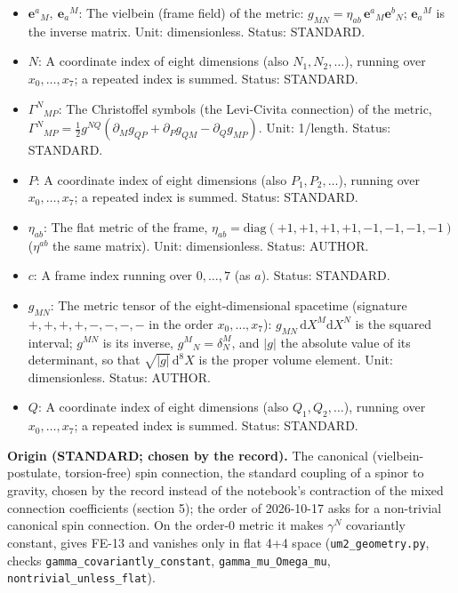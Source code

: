 \documentclass[
  10pt,
]{article}
\begin{document}
\begin{itemize}
  the Clifford algebra of signature \((4, 4)\);
  \(\gamma^M = \mathbf{e}_a{}^M\gamma^a\) along a coordinate
  (\(\gamma^{x_0}\), \(\gamma^{x_4}\), \ldots{} the matrices along
  \(x_0\), \(x_4\), \ldots), \(\gamma_M = g_{MN}\gamma^N\);
  \(\gamma^\mu\) the matrices of the four observable directions in
  four-dimensional formulas. Unit: dimensionless. Status: AUTHOR.
\item
  \(\mathbf{e}^a{}_M,\ \mathbf{e}_a{}^M\): The vielbein (frame field) of
  the metric: \(g_{MN} = \eta_{ab}\,\mathbf{e}^a{}_M\mathbf{e}^b{}_N\);
  \(\mathbf{e}_a{}^M\) is the inverse matrix. Unit: dimensionless.
  Status: STANDARD.
\item
  \(N\): A coordinate index of eight dimensions (also
  \(N_1, N_2, \dots\)), running over \(x_0, \dots, x_7\); a repeated
  index is summed. Status: STANDARD.
\item
  \(\Gamma^N{}_{MP}\): The Christoffel symbols (the Levi-Civita
  connection) of the metric,
  \(\Gamma^N{}_{MP} = \frac12 g^{NQ}(\partial_Mg_{QP} + \partial_Pg_{QM} - \partial_Qg_{MP})\).
  Unit: 1/length. Status: STANDARD.
\item
  \(P\): A coordinate index of eight dimensions (also
  \(P_1, P_2, \dots\)), running over \(x_0, \dots, x_7\); a repeated
  index is summed. Status: STANDARD.
\item
  \(\eta_{ab}\): The flat metric of the frame,
  \(\eta_{ab} = \mathrm{diag}(+1, +1, +1, +1, -1, -1, -1, -1)\)
  (\(\eta^{ab}\) the same matrix). Unit: dimensionless. Status: AUTHOR.
\item
  \(c\): A frame index running over \(0, \dots, 7\) (as \(a\)). Status:
  STANDARD.
\item
  \(g_{MN}\): The metric tensor of the eight-dimensional spacetime
  (signature \(+,+,+,+,-,-,-,-\) in the order \(x_0, \dots, x_7\)):
  \(g_{MN}\,\mathrm{d}X^M\mathrm{d}X^N\) is the squared interval;
  \(g^{MN}\) is its inverse, \(g^M{}_N = \delta^M_N\), and
  \(\lvert g\rvert\) the absolute value of its determinant, so that
  \(\sqrt{\lvert g\rvert}\,\mathrm{d}^8X\) is the proper volume element.
  Unit: dimensionless. Status: AUTHOR.
\item
  \(Q\): A coordinate index of eight dimensions (also
  \(Q_1, Q_2, \dots\)), running over \(x_0, \dots, x_7\); a repeated
  index is summed. Status: STANDARD.
\end{itemize}

\textbf{Origin (STANDARD; chosen by the record).} The canonical
(vielbein-postulate, torsion-free) spin connection, the standard
coupling of a spinor to gravity, chosen by the record instead of the
notebook's contraction of the mixed connection coefficients (section 5);
the order of 2026-10-17 asks for a non-trivial canonical spin
connection. On the order-0 metric it makes \(\gamma^N\) covariantly
constant, gives FE-13 and vanishes only in flat 4+4 space
(\texttt{um2\_geometry.py}, checks
\texttt{gamma\_covariantly\_constant}, \texttt{gamma\_mu\_Omega\_mu},
\texttt{nontrivial\_unless\_flat}).
\end{document}
